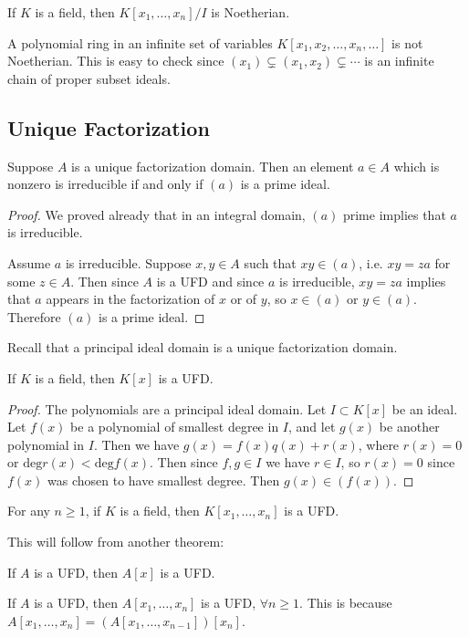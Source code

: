 \begin{xmpl}
If $K$ is a field, then $K[x_1, \dots, x_n] / I$ is Noetherian.
\end{xmpl}

\begin{xmpl}
A polynomial ring in an infinite set of variables
$K[x_1, x_2, \dots, x_n, \dots]$ is not Noetherian. This is easy to
check since $(x_1) \subsetneq (x_1, x_2) \subsetneq \cdots$ is an
infinite chain of proper subset ideals.
\end{xmpl}

\subsection{Unique Factorization}
\begin{prop}
Suppose $A$ is a unique factorization domain. Then an element $a \in
A$ which is nonzero is irreducible if and only if $(a)$ is a prime ideal.
\end{prop}
\begin{proof}
We proved already that in an integral domain, $(a)$ prime implies that
$a$ is irreducible.

Assume $a$ is irreducible. Suppose $x, y \in A$ such that $xy \in
(a)$, i.e. $xy = za$ for some $z \in A$. Then since $A$ is a UFD and
since $a$ is irreducible,
$xy = za$ implies that $a$ appears in the factorization of $x$ or of
$y$, so $x \in (a)$ or $y \in (a)$. Therefore $(a)$ is a prime ideal.
\end{proof}

Recall that a principal ideal domain is a unique factorization domain.

\begin{theorem}
If $K$ is a field, then $K[x]$ is a UFD.
\end{theorem}
\begin{proof}
The polynomials are a principal ideal domain. Let $I \subset K[x]$ be
an ideal. Let $f(x)$ be a polynomial of smallest degree in $I$, and
let $g(x)$ be another polynomial in $I$. Then we have
$g(x) = f(x) q(x) + r(x)$, where $r(x) = 0$ or
$\mathrm{deg} r(x) < \mathrm{deg} f(x)$. Then since $f, g \in I$ we
have $r \in I$, so $r(x) = 0$ since $f(x)$ was chosen to have smallest
degree. Then $g(x) \in (f(x))$.
\end{proof}

\begin{theorem}
For any $n \geq 1$, if $K$ is a field, then
$K[x_1, \dots, x_n]$ is a UFD.
\end{theorem}
This will follow from another theorem:
\begin{theorem}
If $A$ is a UFD, then $A[x]$ is a UFD.
\end{theorem}
\begin{corol}
If $A$ is a UFD, then $A[x_1, \dots, x_n]$ is a UFD, $\forall n \geq
1$. This is because $A[x_1, \dots, x_n] = (A[x_1, \dots, x_{n-1}])[x_n]$.
\end{corol}

